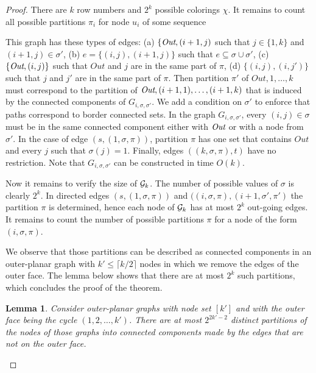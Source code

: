 \documentclass[11pt,english]{article}
\newtheorem{lemma}[theorem]{Lemma}
\numberwithin{figure}{section}
\begin{document}
\begin{proof}
There are $k$ row numbers and $2^k$ possible colorings $\chi$. It remains to count all possible partitions $\pi_i$ for node $u_i$ of some sequence



This graph has these types of edges:
(a) $\{\mbox{\it Out},(i+1,j)$ such that $j\in\{1,k\}$ and $(i+1,j)\in\sigma'$, (b)
$e=\{(i,j),(i+1,j)\}$ such that $e\subseteq \sigma\cup\sigma'$,
(c) $\{\mbox{\it Out},(i,j)\}$
such that $Out$ and $j$ are in the same part of $\pi$, (d) $\{(i,j),(i,j')\}$
such that $j$ and $j'$ are in the same part of $\pi$.  Then partition $\pi'$
of $Out,1,\ldots,k$ must
correspond to the partition of $\mbox{\it Out},(i+1,1),\ldots,(i+1,k)$ that is induced by
the connected components of $G_{i,\sigma,\sigma'}$. We add a condition on $\sigma'$ to enforce that paths correspond to border
connected sets.  In the graph $G_{i,\sigma,\sigma'}$, every $(i,j)\in
\sigma$ must be in the same connected component either with $\mbox{\it Out}$ or with
a node from $\sigma'$. In the case of edge $(s,(1,\sigma,\pi))$, partition $\pi$ has one set that
contains $Out$ and every $j$ such that $\sigma(j)=1$. Finally, edges $((k,\sigma,\pi),t)$ have
no restriction. Note that $G_{i,\sigma,\sigma'}$ can be constructed in time $O(k)$.

Now it remains to verify the size of ${\mathcal G}_k$.  The number of possible values
of $\sigma$ is clearly $2^k$.  In directed edges $(s,(1,\sigma,\pi))$ and
$((i,\sigma,\pi),(i+1,\sigma',\pi')$ the partition $\pi$ is determined, hence
each node of ${\mathcal G}_k$ has at most $2^k$ out-going edges.  It remains to count
the number of possible partitions $\pi$ for a node of the form $(i,\sigma,\pi)$.

We observe that those partitions can be described as connected components
in an outer-planar graph with $k'\le\lceil k/2\rceil$ nodes in which we
remove the edges of the outer face.  The lemma below shows that there
are at most $2^k$ such partitions, which concludes the proof of the theorem.



\begin{lemma} Consider outer-planar graphs with node set $[{k'}]$ and with the
outer face being the cycle $(1,2,\ldots,{k'})$.  There are at most $2^{2{k'}-2}$
distinct partitions of the nodes of those graphs into connected components
made by the edges that are not on the outer face.\end{lemma}


\end{proof}
\end{document}
